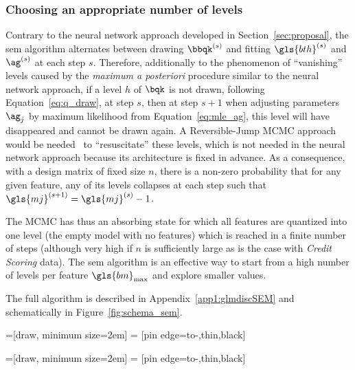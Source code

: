 \subsubsection{Choosing an appropriate number of levels} \label{par:choosing_sem}

Contrary to the neural network approach developed in Section~\ref{sec:proposal}, the \gls{sem} algorithm alternates between drawing $\bbqk^{(s)}$ and fitting ${\gls{bth}}^{(s)}$ and ${\ag}^{(s)}$  at each step $s$. Therefore, additionally to the phenomenon of ``vanishing'' levels caused by the \textit{maximum a posteriori} procedure similar to the neural network approach, if a level $h$ of $\bqk$ is not drawn, following Equation~\eqref{eq:q_draw}, at step $s$, then at step $s+1$ when adjusting parameters $\ag_j$ by maximum likelihood from Equation~\eqref{eq:mle_ag}, this level will have disappeared and cannot be drawn again. A Reversible-Jump MCMC approach would be needed~\cite{green1995reversible} to ``resuscitate'' these levels, which is not needed in the neural network approach because its architecture is fixed in advance. As a consequence, with a design matrix of fixed size $n$, there is a non-zero probability that for any given feature, any of its levels collapses at each step such that $\gls{mj}^{(s+1)} = \gls{mj}^{(s)} - 1$.

The MCMC has thus an absorbing state for which all features are quantized into one level (the empty model with no features) which is reached in a finite number of steps (although very high if $n$ is sufficiently large as is the case with \textit{Credit Scoring} data). The \gls{sem} algorithm is an effective way to start from a high number of levels per feature $\gls{bm}_{\max}$ and explore smaller values.

The full algorithm is described in Appendix~\ref{app1:glmdiscSEM} and schematically in Figure~\ref{fig:schema_sem}.

=[draw, minimum size=2em]
 = [pin edge={to-,thin,black}]

=[draw, minimum size=2em]
 = [pin edge={to-,thin,black}]

